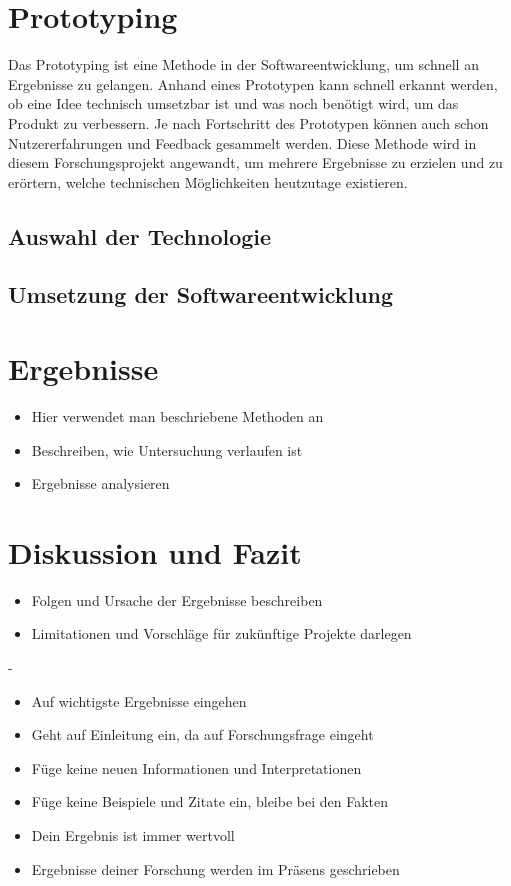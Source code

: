 \documentclass[a4paper,12pt,oneside]{article}
\begin{document}
  \section{Prototyping}
    Das Prototyping ist eine Methode in der Softwareentwicklung, um schnell an
    Ergebnisse zu gelangen. Anhand eines Prototypen kann schnell erkannt werden,
    ob eine Idee technisch umsetzbar ist und was noch benötigt wird, um das Produkt
    zu verbessern. Je nach Fortschritt des Prototypen können auch schon Nutzererfahrungen
    und Feedback gesammelt werden.
    Diese Methode wird in diesem Forschungsprojekt angewandt, um mehrere Ergebnisse
    zu erzielen und zu erörtern, welche technischen Möglichkeiten heutzutage existieren.
    \subsection{Auswahl der Technologie}
    
    \subsection{Umsetzung der Softwareentwicklung}
  \section{Ergebnisse}
    \begin{itemize}
      \item Hier verwendet man beschriebene Methoden an
      \item Beschreiben, wie Untersuchung verlaufen ist
      \item Ergebnisse analysieren
    \end{itemize}
  \section{Diskussion und Fazit}
    \begin{itemize}
      \item Folgen und Ursache der Ergebnisse beschreiben
      \item Limitationen und Vorschläge für zukünftige Projekte darlegen
    \end{itemize}
    -
    \begin{itemize}
      \item Auf wichtigste Ergebnisse eingehen
      \item Geht auf Einleitung ein, da auf Forschungsfrage eingeht
      \item Füge keine neuen Informationen und Interpretationen
      \item Füge keine Beispiele und Zitate ein, bleibe bei den Fakten
      \item Dein Ergebnis ist immer wertvoll
      \item Ergebnisse deiner Forschung werden im Präsens geschrieben
    \end{itemize}
\end{document}
